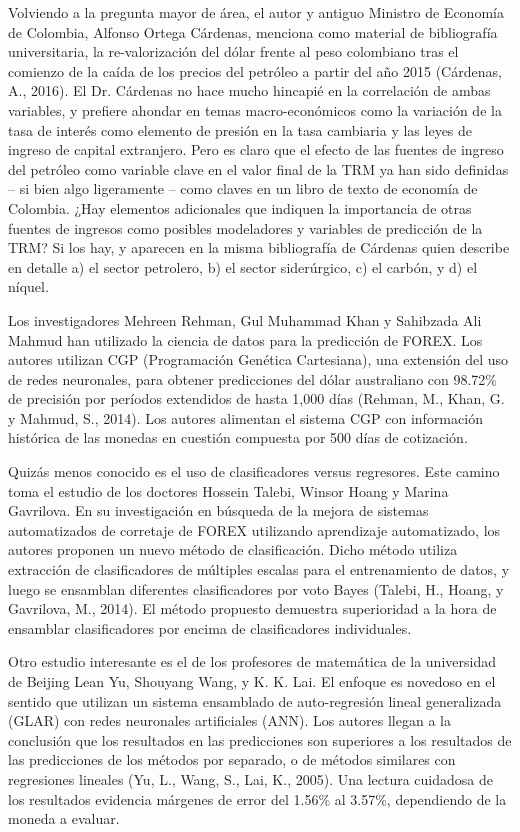 \begin{spacing}{1.5}
Volviendo a la pregunta mayor de área, el autor y antiguo Ministro de Economía de Colombia, Alfonso Ortega Cárdenas, menciona como material de bibliografía universitaria, la re-valorización del dólar frente al peso colombiano tras el comienzo de la caída de los precios del petróleo a partir del año 2015 (Cárdenas, A., 2016). El Dr. Cárdenas no hace mucho hincapié en la correlación de ambas variables, y prefiere ahondar en temas macro-económicos como la variación de la tasa de interés como elemento de presión en la tasa cambiaria y las leyes de ingreso de capital extranjero. Pero es claro que el efecto de las fuentes de ingreso del petróleo como variable clave en el valor final de la TRM ya han sido definidas – si bien algo ligeramente – como claves en un libro de texto de economía de Colombia. ¿Hay elementos adicionales que indiquen la importancia de otras fuentes de ingresos como posibles modeladores y variables de predicción de la TRM? Si los hay, y aparecen en la misma bibliografía de Cárdenas quien describe en detalle a) el sector petrolero, b) el sector siderúrgico, c) el carbón, y d) el níquel.
 
Los investigadores Mehreen Rehman, Gul Muhammad Khan y Sahibzada Ali Mahmud han utilizado la ciencia de datos para la predicción de FOREX. Los autores utilizan CGP (Programación Genética Cartesiana), una extensión del uso de redes neuronales, para obtener predicciones del dólar australiano con 98.72\% de precisión por períodos extendidos de hasta 1,000 días (Rehman, M., Khan, G. y Mahmud, S., 2014). Los autores alimentan el sistema CGP con información histórica de las monedas en cuestión compuesta por 500 días de cotización.
 
Quizás menos conocido es el uso de clasificadores versus regresores. Este camino toma el estudio de los doctores Hossein Talebi, Winsor Hoang y Marina Gavrilova. En su investigación en búsqueda de la mejora de sistemas automatizados de corretaje de FOREX utilizando aprendizaje automatizado, los autores proponen un nuevo método de clasificación. Dicho método utiliza extracción de clasificadores de múltiples escalas para el entrenamiento de datos, y luego se ensamblan diferentes clasificadores por voto Bayes (Talebi, H., Hoang, y Gavrilova, M., 2014). El método propuesto demuestra superioridad a la hora de ensamblar clasificadores por encima de clasificadores individuales.
 
Otro estudio interesante es el de los profesores de matemática de la universidad de Beijing Lean Yu, Shouyang Wang, y K. K. Lai. El enfoque es novedoso en el sentido que utilizan un sistema ensamblado de auto-regresión lineal generalizada (GLAR) con redes neuronales artificiales (ANN). Los autores llegan a la conclusión que los resultados en las predicciones son superiores a los resultados de las predicciones de los métodos por separado, o de métodos similares con regresiones lineales (Yu, L., Wang, S., Lai, K., 2005). Una lectura cuidadosa de los resultados evidencia márgenes de error del 1.56\% al 3.57\%, dependiendo de la moneda a evaluar.


\end{spacing}
